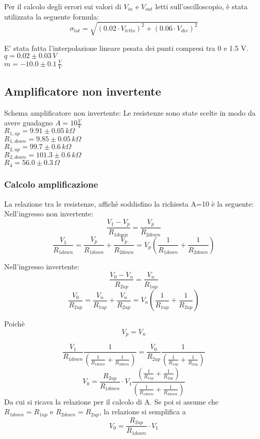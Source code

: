 Per il calcolo degli errori sui valori di $V_{in}$ e $V_{out}$ letti sull'oscilloscopio, è stata utilizzata la seguente formula:
$$\sigma_{tot}=\sqrt{ (0.02\cdot V_{letto})^2 + (0.06 \cdot V_{div})^2}$$

E' stata fatta l'interpolazione lineare pesata dei punti compresi tra 0 e 1.5 V.\\
$q = 0.02 \pm 0.03 \,V$\\
$m = -10.0 \pm 0.1 \, \frac{V}{V}$




\subsection{Amplificatore non invertente}

Schema amplificatore non invertente:
Le resistenze sono state scelte in modo da avere guadagno $A=10 \frac{V}{V}$\\
$R_{1,up}=9.91 \pm0.05 \,k\Omega $\\ %
$R_{1,down}=9.85 \pm 0.05\,k\Omega$\\ %
$R_{2,up}=99.7 \pm 0.6\,k\Omega$\\ %
$R_{2,down}=101.3 \pm 0.6\,k\Omega$\\
$R_4=56.0 \pm 0.3\,\Omega$

\subsubsection{Calcolo amplificazione}
La relazione tra le resistenze, affichè soddisfino la richiesta A=10 è la seguente:
Nell'ingresso non invertente:
$$\frac{V_1-V_p}{R_{1down}}=\frac{V_p}{R_{2down}}$$
$$\frac{V_1}{R_{1down}}=\frac{V_p}{R_{1down}}+\frac{V_p}{R_{2down}}=V_p \left(\frac{1}{R_{1down}}+\frac{1}{R_{2down}}\right)$$

Nell'ingresso invertente:
$$\frac{V_0-V_n}{R_{2up}}=\frac{V_n}{R_{1up}}$$
$$\frac{V_0}{R_{2up}}=\frac{V_n}{R_{1up}}+\frac{V_n}{R_{2up}}=V_n \left(\frac{1}{R_{1up}}+\frac{1}{R_{2up}}\right)$$

Poichè 
$$V_p=V_n$$

$$\frac{V_1}{R_{1down}} \frac{1}{\left(\frac{1}{R_{1down}}+\frac{1}{R_{2down} }\right)}=\frac{V_0}{R_{2up}} \frac{1}{\left(\frac{1}{R_{1up}}+\frac{1}{R_{2up}} \right)}$$
$$V_0=\frac{R_{2up}}{R_{1down}} \cdot V_1 \frac{\left(\frac{1}{R_{1up}}+\frac{1}{R_{2up} }\right)}{\left(\frac{1}{R_{1down}}+\frac{1}{R_{2down}} \right)}$$
Da cui si ricava la relazione per il calcolo di A.
Se poi si assume che $R_{1down}=R_{1up}$ e $R_{2down}=R_{2up}$, la relazione si semplifica a 
$$V_0=\frac{R_{2up}}{R_{1down}} \cdot V_1$$
